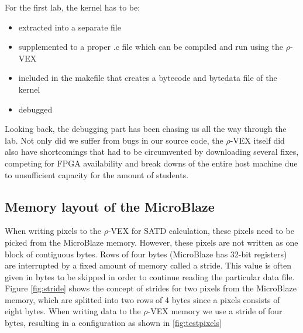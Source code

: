 For the first lab, the  kernel has to be:
\begin{itemize}
	\item extracted into a separate file
	\item supplemented to a proper .c file which can be compiled and run using the $\rho$-VEX
	\item included in the makefile that creates a bytecode and bytedata file of the kernel
	\item debugged
\end{itemize}

Looking back, the debugging part has been chasing us all the way through the lab. Not only did we suffer from bugs in our source code, the $\rho$-VEX itself did also have shortcomings that had to be circumvented by downloading several fixes, competing for FPGA availability and break downs of the entire host machine due to unsufficient capacity for the amount of students.

\subsection{Memory layout of the MicroBlaze}

When writing pixels to the $\rho$-VEX for SATD calculation, these pixels need to be picked from the MicroBlaze memory. However, these pixels are not written as one block of contiguous bytes. Rows of four bytes (MicroBlaze has 32-bit registers) are interrupted by a fixed amount of memory called a stride. This value is often given in bytes to be skipped in order to continue reading the particular data file. Figure \ref{fig:stride} shows the concept of strides for two pixels from the MicroBlaze memory, which are splitted into two rows of 4 bytes since a pixels consists of eight bytes. When writing data to the $\rho$-VEX memory we use a stride of four bytes, resulting in a configuration as shown in \ref{fig:testpixels}


